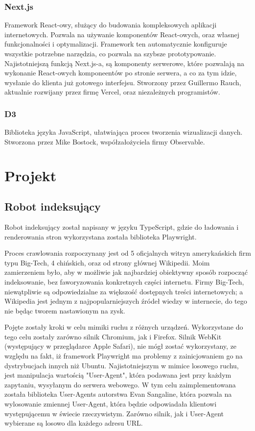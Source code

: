 \documentclass[a4paper, 12pt]{article}
\begin{document}
\subsubsection{Next.js}
Framework React-owy, służący do budowania kompleksowych aplikacji internetowych. Pozwala na używanie komponentów React-owych, oraz własnej funkcjonalności i optymalizacji. Framework ten automatycznie konfiguruje wszystkie potrzebne narzędzia, co pozwala na szybsze prototypowanie. Najistotniejszą funkcją Next.js-a, są komponenty serwerowe, które pozwalają na wykonanie React-owych komponeentów po stronie serwera, a co za tym idzie, wysłanie do klienta już gotowego interfejsu.\cite{introNextjs} Stworzony przez Guillermo Rauch\cite{githubNextjsInit}, aktualnie rozwijany przez firmę Vercel, oraz niezależnych programistów.\cite{githubNextjsContributors}
\subsubsection{D3}
Biblioteka języka JavaScript, ułatwiająca proces tworzenia wizualizacji danych.\cite{homeD3} Stworzona przez Mike Bostock, współzałożyciela firmy Observable.\cite{githubD3Init}

\section{Projekt}
\subsection{Robot indeksujący}
Robot indeksujący został napisany w języku TypeScript, gdzie do ładowania i renderowania stron wykorzystana została biblioteka Playwright.

Proces crawlowania rozpoczynany jest od 5 oficjalnych witryn amerykańskich firm typu Big-Tech, 4 chińskich, oraz od strony głównej Wikipedii. Moim zamierzeniem było, aby w możliwie jak najbardziej obiektywny sposób rozpocząć indeksowanie, bez faworyzowania konkretnych części internetu. Firmy Big-Tech, niewątpliwie są odpowiedzialne za większość dostępnych treści internetowych; a Wikipedia jest jednym z najpopularniejszych źródeł wiedzy w internecie, do tego nie będąc tworem nastawionym na zysk.

Pojęte zostały kroki w celu mimiki ruchu z różnych urządzeń. Wykorzystane do tego celu zostały zarówno silnik Chromium, jak i Firefox. Silnik WebKit (występujący w przeglądarce Apple Safari), nie mógł zostać wykorzystany, ze względu na fakt, iż framework Playwright ma problemy z zainicjowaniem go na dystrybucjach innych niż Ubuntu.\cite{playwrightWebkitIssue} Najistotniejszym w mimice losowego ruchu, jest manipulacja wartością "User-Agent", która podawana jest przy każdym zapytaniu, wysyłanym do serwera webowego. W tym celu zaimplementowana została biblioteka User-Agents autorstwa Evan Sangaline, która pozwala na wylosowanie zmiennej User-Agent, która będzie odpowiadała klientowi występującemu w świecie rzeczywistym. Zarówno silnik, jak i User-Agent wybierane są losowo dla każdego adresu URL.
\end{document}
